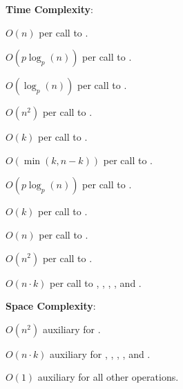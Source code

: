 \textbf{Time Complexity}:
\begin{compactitem}
  \item $O(n)$ per call to .
  \item $O(p \log_{p}\left(n\right))$ per call to .
  \item $O(\log_{p}\left(n\right))$ per call to .
  \item $O(n^{2})$ per call to .
  \item $O(k)$ per call to .
  \item $O(\min\left(k, n - k\right))$ per call to .
  \item $O(p \log_{p}\left(n\right))$ per call to .
  \item $O(k)$ per call to .
  \item $O(n)$ per call to .
  \item $O(n^{2})$ per call to .
  \item $O(n \cdot k)$ per call to , , , , and .
\end{compactitem}

\textbf{Space Complexity}:
\begin{compactitem}
  \item $O(n^{2})$ auxiliary for .
  \item $O(n \cdot k)$ auxiliary for , , , , and .
  \item $O(1)$ auxiliary for all other operations.
\end{compactitem}

